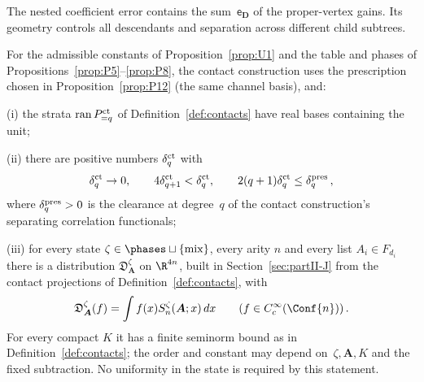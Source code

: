 \begin{remark}
The nested coefficient error contains the sum~$\mathsf e_{\boldsymbol D}$ of the proper-vertex gains. Its geometry controls all descendants and separation across different child subtrees.
\end{remark}

\begin{proposition}\label{prop:P13}
For the admissible constants of Proposition~\ref{prop:U1} and the table and phases of Propositions~\ref{prop:P5}--\ref{prop:P8}, the contact construction uses the prescription chosen in Proposition~\ref{prop:P12} (the same channel basis), and:

(i) the strata $\operatorname{ran}P^{\rm ct}_{=q}$ of Definition~\ref{def:contacts} have real bases containing the unit;

(ii) there are positive numbers $\delta_q^{\rm ct}$ with
\begin{equation}\label{eq:P13-1}
\delta_q^{\rm ct}\to0,\qquad 4\delta_{q+1}^{\rm ct}<\delta_q^{\rm ct},\qquad 2(q+1)\delta_q^{\rm ct}\le\delta_q^{\rm pres}\,,
\end{equation}
where $\delta_q^{\rm pres}>0$ is the clearance at degree~$q$ of the contact construction's separating correlation functionals;

(iii) for every state $\zeta\in\phases\sqcup\{\mathrm{mix}\}$, every arity $n$ and every list $A_i\in F_{d_i}$ there is a distribution $\mathfrak D_{\boldsymbol A}^\zeta$ on $\R^{4n}$, built in Section~\ref{sec:partII-J} from the contact projections of Definition~\ref{def:contacts}, with
\begin{equation}\label{eq:P13-2}
\mathfrak D_{\boldsymbol A}^\zeta(f)=\int f(x)S_n^\zeta(\boldsymbol A;x)\,dx\qquad(f\in C_c^\infty(\Conf{n}))\,.
\end{equation}
For every compact $K$ it has a finite seminorm bound as in Definition~\ref{def:contacts}; the order and constant may depend on~$\zeta,\boldsymbol A,K$ and the fixed subtraction. No uniformity in the state is required by this statement.
\end{proposition}

